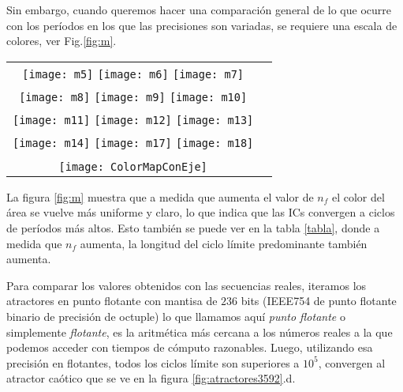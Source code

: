 Sin embargo, cuando queremos hacer una comparación general de lo que ocurre con los períodos en los que las precisiones son variadas, se requiere una escala de colores, ver Fig.\ref{fig:m}.
%
\begin{figure*}
\centering
\begin{tabular}{cc}
\texttt{[image: m5]}
\texttt{[image: m6]}
\texttt{[image: m7]}\\
\texttt{[image: m8]}
\texttt{[image: m9]}
\texttt{[image: m10]}\\
\texttt{[image: m11]}
\texttt{[image: m12]}
\texttt{[image: m13]}\\
\texttt{[image: m14]}
\texttt{[image: m17]}
\texttt{[image: m18]}\\
\\   
\texttt{[image: ColorMapConEje]}
\end{tabular}
\caption{Evolución de las longitudes de período de los dominios de atracción para: (a) $n_f=5$, (b) $n_f=6$, (c) $n_f=7$, (d) $n_f=8$, (e) $n_f=9$, (f) $n_f=10$, (g) $n_f=11$, (h) $n_f=12$, (i) $n_f=13$, (j) $n_f=14$, (k) $n_f=17$, (l) $n_f=18$.}
\label{fig:m}
\end{figure*}

La figura \ref{fig:m} muestra que a medida que aumenta el valor de $n_f$ el color del área se vuelve más uniforme y claro, lo que indica que las ICs convergen a ciclos de períodos más altos.
Esto también se puede ver en la tabla \ref{tabla}, donde a medida que $n_f$ aumenta, la longitud del ciclo límite predominante también aumenta.

Para comparar los valores obtenidos con las secuencias reales, iteramos los atractores en punto flotante con mantisa de $236$ bits (IEEE754 de punto flotante binario de precisión de octuple) lo que llamamos aquí \textit{punto flotante} o simplemente \textit{flotante}, es la aritmética más cercana a los números reales a la que podemos acceder con tiempos de cómputo razonables.
Luego, utilizando esa precisión en flotantes, todos los ciclos límite son superiores a $10 ^ 5$, convergen al atractor caótico que se ve en la figura \ref{fig:atractores3592}.d.

